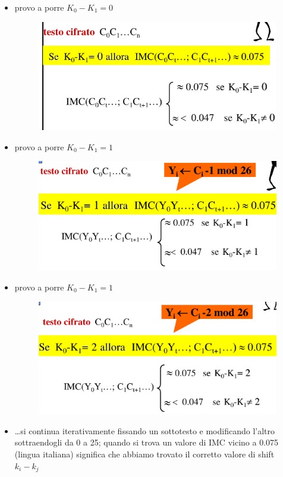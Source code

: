 \begin{itemize}
    \item provo a porre $K_0 - K_1 = 0$
    \begin{figure}[H]
    \centering
    \includegraphics[width=0.65\linewidth]{chapters/chap02/images/imc3.png}
    \end{figure}
    
    \item provo a porre $K_0 - K_1 = 1$
    \begin{figure}[H]
    \centering
    \includegraphics[width=0.65\linewidth]{chapters/chap02/images/imc4.png}
    \end{figure}  

    \item provo a porre $K_0 - K_1 = 1$
    \begin{figure}[H]
        \centering
    \includegraphics[width=0.65\linewidth]{chapters/chap02/images/imc5.png}
    \end{figure} 

    \item \dots si continua iterativamente fissando un sottotesto e modificando l'altro 
    sottraendogli da 0 a 25; quando si trova un valore di IMC vicino a 0.075 (lingua italiana) significa 
    che abbiamo trovato il corretto valore di shift $k_i - k_j$

\end{itemize}

